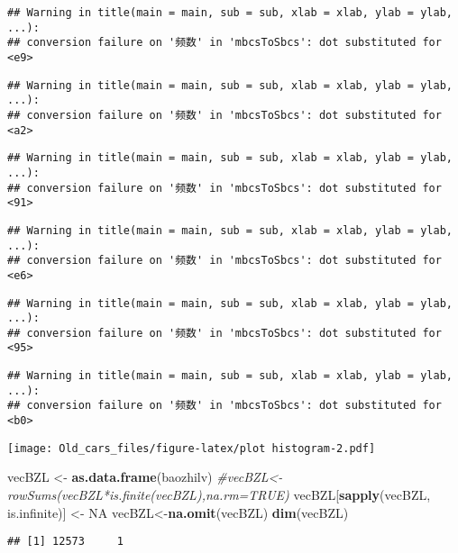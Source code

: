 \documentclass[]{article}
\newenvironment{Shaded}{\begin{snugshade}}{\end{snugshade}}
\newcommand{\KeywordTok}[1]{\textcolor[rgb]{0.13,0.29,0.53}{\textbf{#1}}}
\newcommand{\StringTok}[1]{\textcolor[rgb]{0.31,0.60,0.02}{#1}}
\newcommand{\CommentTok}[1]{\textcolor[rgb]{0.56,0.35,0.01}{\textit{#1}}}
\newcommand{\OtherTok}[1]{\textcolor[rgb]{0.56,0.35,0.01}{#1}}
\newcommand{\NormalTok}[1]{#1}
\begin{document}
\begin{verbatim}
## Warning in title(main = main, sub = sub, xlab = xlab, ylab = ylab, ...):
## conversion failure on '频数' in 'mbcsToSbcs': dot substituted for <e9>
\end{verbatim}

\begin{verbatim}
## Warning in title(main = main, sub = sub, xlab = xlab, ylab = ylab, ...):
## conversion failure on '频数' in 'mbcsToSbcs': dot substituted for <a2>
\end{verbatim}

\begin{verbatim}
## Warning in title(main = main, sub = sub, xlab = xlab, ylab = ylab, ...):
## conversion failure on '频数' in 'mbcsToSbcs': dot substituted for <91>
\end{verbatim}

\begin{verbatim}
## Warning in title(main = main, sub = sub, xlab = xlab, ylab = ylab, ...):
## conversion failure on '频数' in 'mbcsToSbcs': dot substituted for <e6>
\end{verbatim}

\begin{verbatim}
## Warning in title(main = main, sub = sub, xlab = xlab, ylab = ylab, ...):
## conversion failure on '频数' in 'mbcsToSbcs': dot substituted for <95>
\end{verbatim}

\begin{verbatim}
## Warning in title(main = main, sub = sub, xlab = xlab, ylab = ylab, ...):
## conversion failure on '频数' in 'mbcsToSbcs': dot substituted for <b0>
\end{verbatim}

\texttt{[image: Old\_cars\_files/figure-latex/plot histogram-2.pdf]}

\begin{Shaded}
\begin{Highlighting}[]
\NormalTok{vecBZL <-}\StringTok{ }\KeywordTok{as.data.frame}\NormalTok{(baozhilv)}
\CommentTok{#vecBZL<-rowSums(vecBZL*is.finite(vecBZL),na.rm=TRUE)}
\NormalTok{vecBZL[}\KeywordTok{sapply}\NormalTok{(vecBZL, is.infinite)] <-}\StringTok{ }\OtherTok{NA}
\NormalTok{vecBZL<-}\KeywordTok{na.omit}\NormalTok{(vecBZL)}
\KeywordTok{dim}\NormalTok{(vecBZL)}
\end{Highlighting}
\end{Shaded}

\begin{verbatim}
## [1] 12573     1
\end{verbatim}
\end{document}
